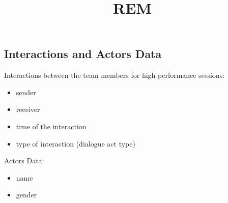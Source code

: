 \documentclass[
]{article}
\title{REM}
\author{}
\date{\vspace{-2.5em}}
\begin{document}
\maketitle

\hypertarget{interactions-and-actors-data}{%
\subsection{Interactions and Actors
Data}\label{interactions-and-actors-data}}

Interactions between the team members for high-performance sessions:

\begin{itemize}
\item
  sender
\item
  receiver
\item
  time of the interaction
\item
  type of interaction (dialogue act type)
\end{itemize}

Actors Data:

\begin{itemize}
\item
  name
\item
  gender
\end{itemize}
\end{document}
